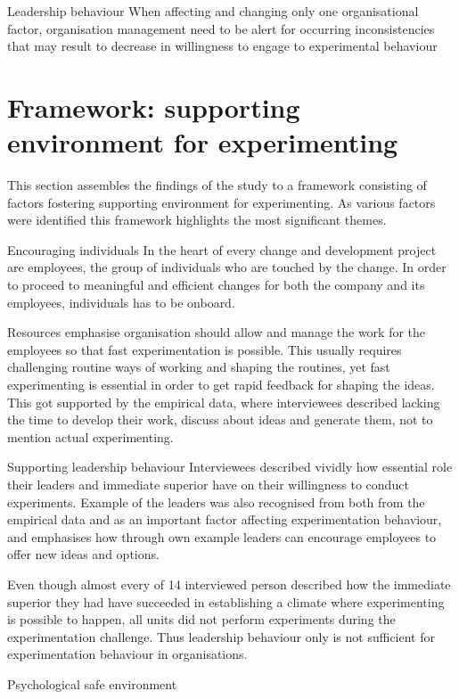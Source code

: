 Leadership behaviour 
When affecting and changing only one organisational factor, organisation management need to be alert for occurring inconsistencies that may result to decrease in willingness to engage to experimental behaviour \citep{lee2004mixed}


\section{Framework: supporting environment for experimenting} \label{framework}
This section assembles the findings of the study to a framework consisting of factors fostering supporting environment for experimenting. As various factors were identified this framework highlights the most significant themes.  

Encouraging individuals
In the heart of every change and development project are employees, the group of individuals who are touched by the change. In order to proceed to meaningful and efficient changes for both the company and its employees, individuals has to be onboard. 

Resources
\citet{thomke2001enlightened} emphasise organisation should allow and manage the work for the employees so that fast experimentation is possible. This usually requires challenging routine ways of working and shaping the routines, yet fast experimenting is essential in order to get rapid feedback for shaping the ideas. This got supported by the empirical data, where interviewees described lacking the time to develop their work, discuss about ideas and generate them, not to mention actual experimenting. 

Supporting leadership behaviour 
Interviewees described vividly how essential role their leaders and immediate superior have on their willingness to conduct experiments. 
Example of the leaders was also recognised from both from the empirical data and as an important factor affecting experimentation behaviour, and \citet{garvin2008yours} emphasises how through own example leaders can encourage employees to offer new ideas and options.

Even though almost every of 14 interviewed person described how the immediate superior they had have succeeded in establishing a climate where experimenting is possible to happen, all units did not perform experiments during the experimentation challenge. Thus leadership behaviour only is not sufficient for experimentation behaviour in organisations.

Psychological safe environment

